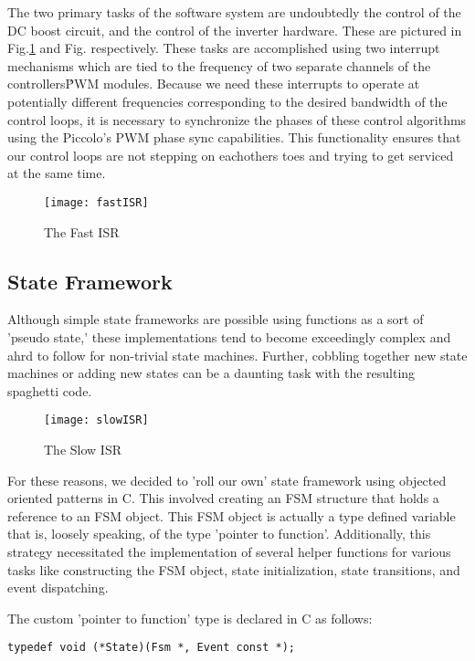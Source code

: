 The two primary tasks of the software system are undoubtedly the control of the DC boost circuit, and the control of the inverter hardware. These are pictured in Fig.\ref{fast} and Fig.\cite{fast} respectively. These tasks are accomplished using two interrupt mechanisms which are tied to the frequency of two separate channels of the controllers\' PWM modules. Because we need these interrupts to operate at potentially different frequencies corresponding to the desired bandwidth of the control loops, it is necessary to synchronize the phases of these control algorithms using the Piccolo's PWM phase sync capabilities. This functionality ensures that our control loops are not stepping on eachothers toes and trying to get serviced at the same time. 

\begin{figure}[h]
\begin{center}
\texttt{[image: fastISR]}
\caption{The Fast ISR}
\label{fast}
\end{center}
\end{figure}
\subsection{State Framework}
Although simple state frameworks are possible using functions as a sort of 'pseudo state,' these implementations tend to become exceedingly complex and ahrd to follow for non-trivial state machines. Further, cobbling together new state machines or adding new states can be a daunting task with the resulting spaghetti code. 

\begin{figure}[h]
\begin{center}
\texttt{[image: slowISR]}
\caption{The Slow ISR}
\label{slow}
\end{center}
\end{figure}

For these reasons, we decided to 'roll our own' state framework using objected oriented patterns in C. This involved creating an FSM structure that holds a reference to an FSM object. This FSM object is actually a type defined variable that is, loosely speaking, of the type 'pointer to function'. Additionally, this strategy necessitated the implementation of several helper functions for various tasks like constructing the FSM object, state initialization, state transitions, and event dispatching. 

The custom 'pointer to function' type is declared in C as follows:
\begin{lstlisting}
typedef void (*State)(Fsm *, Event const *);
\end{lstlisting}

